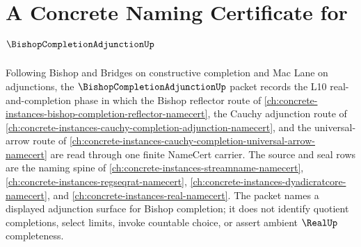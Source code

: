 \chapter{A Concrete Naming Certificate for $\BishopCompletionAdjunctionUp$}
\label{ch:concrete-instances-bishop-completion-adjunction-namecert}

Following Bishop and Bridges on constructive completion and Mac Lane on adjunctions, the $\BishopCompletionAdjunctionUp$ packet records the L10 real-and-completion phase in which the Bishop reflector route of \autoref{ch:concrete-instances-bishop-completion-reflector-namecert}, the Cauchy adjunction route of \autoref{ch:concrete-instances-cauchy-completion-adjunction-namecert}, and the universal-arrow route of \autoref{ch:concrete-instances-cauchy-completion-universal-arrow-namecert} are read through one finite NameCert carrier. The source and seal rows are the naming spine of \autoref{ch:concrete-instances-streamname-namecert}, \autoref{ch:concrete-instances-regseqrat-namecert}, \autoref{ch:concrete-instances-dyadicratcore-namecert}, and \autoref{ch:concrete-instances-real-namecert}. The packet names a displayed adjunction surface for Bishop completion; it does not identify quotient completions, select limits, invoke countable choice, or assert ambient $\RealUp$ completeness.


